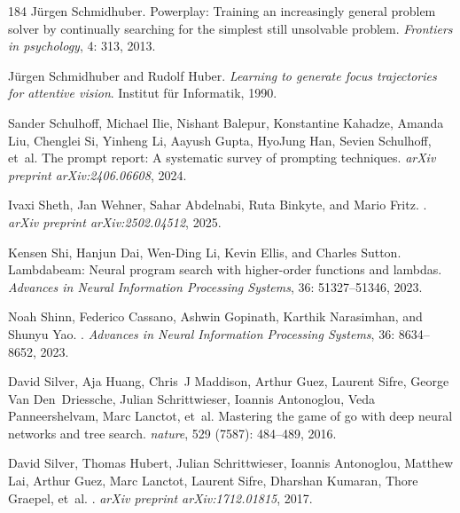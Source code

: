 \begin{thebibliography}{184}
J{\"u}rgen Schmidhuber.
\newblock Powerplay: Training an increasingly general problem solver by
  continually searching for the simplest still unsolvable problem.
\newblock \emph{Frontiers in psychology}, 4: 313, 2013.

J{\"u}rgen Schmidhuber and Rudolf Huber.
\newblock \emph{Learning to generate focus trajectories for attentive vision}.
\newblock Institut f{\"u}r Informatik, 1990.

Sander Schulhoff, Michael Ilie, Nishant Balepur, Konstantine Kahadze, Amanda
  Liu, Chenglei Si, Yinheng Li, Aayush Gupta, HyoJung Han, Sevien Schulhoff,
  et~al.
\newblock The prompt report: A systematic survey of prompting techniques.
\newblock \emph{arXiv preprint arXiv:2406.06608}, 2024.

Ivaxi Sheth, Jan Wehner, Sahar Abdelnabi, Ruta Binkyte, and Mario Fritz.
.
\newblock \emph{arXiv preprint arXiv:2502.04512}, 2025.

Kensen Shi, Hanjun Dai, Wen-Ding Li, Kevin Ellis, and Charles Sutton.
\newblock Lambdabeam: Neural program search with higher-order functions and
  lambdas.
\newblock \emph{Advances in Neural Information Processing Systems},
  36: 51327--51346, 2023.

Noah Shinn, Federico Cassano, Ashwin Gopinath, Karthik Narasimhan, and Shunyu
  Yao.
.
\newblock \emph{Advances in Neural Information Processing Systems},
  36: 8634--8652, 2023.

David Silver, Aja Huang, Chris~J Maddison, Arthur Guez, Laurent Sifre, George
  Van Den~Driessche, Julian Schrittwieser, Ioannis Antonoglou, Veda
  Panneershelvam, Marc Lanctot, et~al.
\newblock Mastering the game of go with deep neural networks and tree search.
\newblock \emph{nature}, 529 (7587): 484--489, 2016.

David Silver, Thomas Hubert, Julian Schrittwieser, Ioannis Antonoglou, Matthew
  Lai, Arthur Guez, Marc Lanctot, Laurent Sifre, Dharshan Kumaran, Thore
  Graepel, et~al.
.
\newblock \emph{arXiv preprint arXiv:1712.01815}, 2017.


\end{thebibliography}
